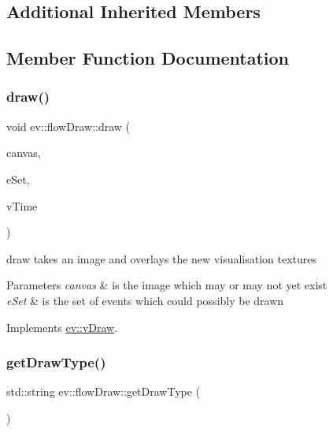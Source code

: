 \subsection*{Additional Inherited Members}


\subsection{Member Function Documentation}
\mbox{\label{classev_1_1flowDraw_a15d97ddaf93734a912be64fb60977ee2}} 
\subsubsection{\texorpdfstring{draw()}{draw()}}
{\footnotesize\ttfamily void ev\+::flow\+Draw\+::draw (\begin{DoxyParamCaption}\item[{cv\+::\+Mat \&}]{canvas,  }\item[{const ev\+::v\+Queue \&}]{e\+Set,  }\item[{int}]{v\+Time }\end{DoxyParamCaption})\hspace{0.3cm}{\ttfamily [virtual]}}



draw takes an image and overlays the new visualisation textures 


\begin{DoxyParams}{Parameters}
{\em canvas} & is the image which may or may not yet exist \\
\hline
{\em e\+Set} & is the set of events which could possibly be drawn \\
\hline
\end{DoxyParams}


Implements \hyperlink{classev_1_1vDraw_af1eee5dcdf3b4cfee6a3024e5cd706f8}{ev\+::v\+Draw}.

\mbox{\label{classev_1_1flowDraw_a6caf6d848d79407e62b7bf13c58d583e}} 
\subsubsection{\texorpdfstring{get\+Draw\+Type()}{getDrawType()}}
{\footnotesize\ttfamily std\+::string ev\+::flow\+Draw\+::get\+Draw\+Type (\begin{DoxyParamCaption}{ }\end{DoxyParamCaption})\hspace{0.3cm}{\ttfamily [virtual]}}



